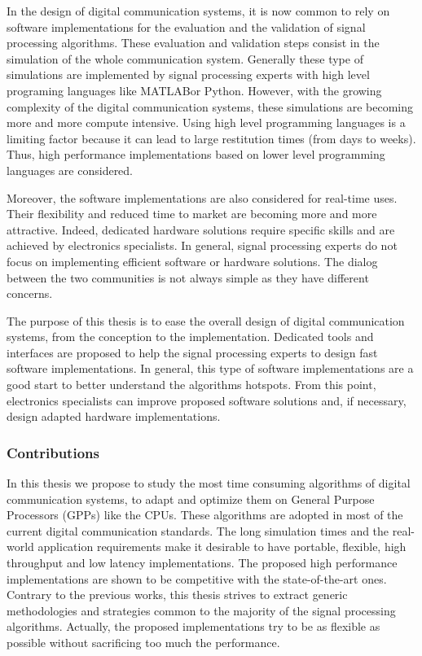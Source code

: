 In the design of digital communication systems, it is now common to rely on
software implementations for the evaluation and the validation of signal
processing algorithms. These evaluation and validation steps consist in
the simulation of the whole communication system. Generally these type of
simulations are implemented by signal processing experts with high level
programing languages like MATLAB\R or Python. However, with the growing
complexity of the digital communication systems, these simulations are becoming
more and more compute intensive. Using high level programming languages is a
limiting factor because it can lead to large restitution times (from days to
weeks). Thus, high performance implementations based on lower level programming
languages are considered.

Moreover, the software implementations are also considered for real-time uses.
Their flexibility and reduced time to market are becoming more and more
attractive. Indeed, dedicated hardware solutions require specific skills and are
achieved by electronics specialists. In general, signal processing experts
do not focus on implementing efficient software or hardware solutions. The
dialog between the two communities is not always simple as they have different
concerns.

The purpose of this thesis is to ease the overall design of digital
communication systems, from the conception to the implementation. Dedicated
tools and interfaces are proposed to help the signal processing experts to
design fast software implementations. In general, this type of software
implementations are a good start to better understand the algorithms hotspots.
From this point, electronics specialists can improve proposed software solutions
and, if necessary, design adapted hardware implementations.

\subsubsection*{Contributions}

In this thesis we propose to study the most time consuming algorithms of digital
communication systems, to adapt and optimize them on General Purpose Processors
(GPPs) like the CPUs. These algorithms are adopted in most of the current
digital communication standards. The long simulation times and the real-world
application requirements make it desirable to have portable, flexible, high
throughput and low latency implementations. The proposed high performance
implementations are shown to be competitive with the state-of-the-art ones.
Contrary to the previous works, this thesis strives to extract generic
methodologies and strategies common to the majority of the signal processing
algorithms. Actually, the proposed implementations try to be as flexible as
possible without sacrificing too much the performance.

